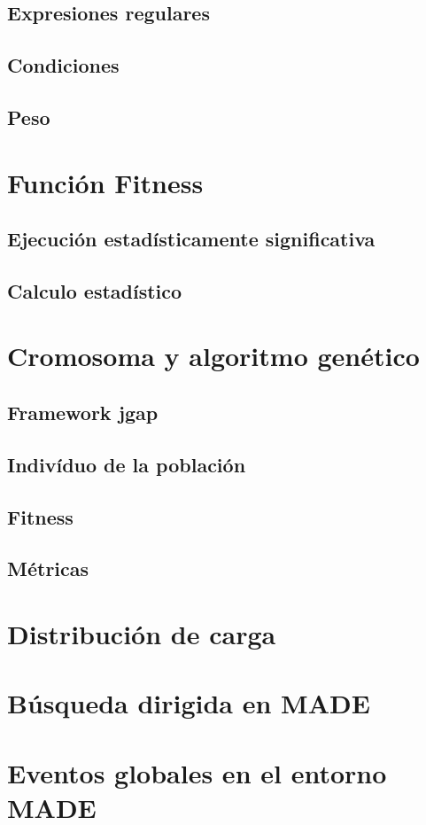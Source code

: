 \subsection{Expresiones regulares}

\subsection{Condiciones}

\subsection{Peso}

\section{Función Fitness}

\subsection{Ejecución estadísticamente significativa}

\subsection{Calculo estadístico}

\section{Cromosoma y algoritmo genético}

\subsection{Framework jgap}

\subsection{Indivíduo de la población}

\subsection{Fitness}

\subsection{Métricas}

\section{Distribución de carga}

\section{Búsqueda dirigida en MADE}

\section{Eventos globales en el entorno MADE}
